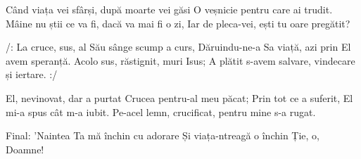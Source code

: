 \beginverse
Când viața vei sfârși, după moarte vei găsi
O veșnicie pentru care ai trudit.
Mâine nu știi ce va fi, dacă va mai fi o zi,
Iar de pleca-vei, ești tu oare pregătit?
\endverse

\beginchorus
/: La cruce, sus, al Său sânge scump a curs,
Dăruindu-ne-a Sa viață, azi prin El avem speranță.
Acolo sus, răstignit, muri Isus;
A plătit s-avem salvare, vindecare și iertare. :/
\endchorus

\beginverse*
El, nevinovat, dar a purtat
Crucea pentru-al meu păcat;
Prin tot ce a suferit, El mi-a spus cât m-a iubit.
Pe-acel lemn, crucificat, pentru mine s-a rugat.
\endverse

\beginverse*
Final: 'Naintea Ta mă închin cu adorare
Și viața-ntreagă o închin Ție, o, Doamne!
\endverse
\endsong